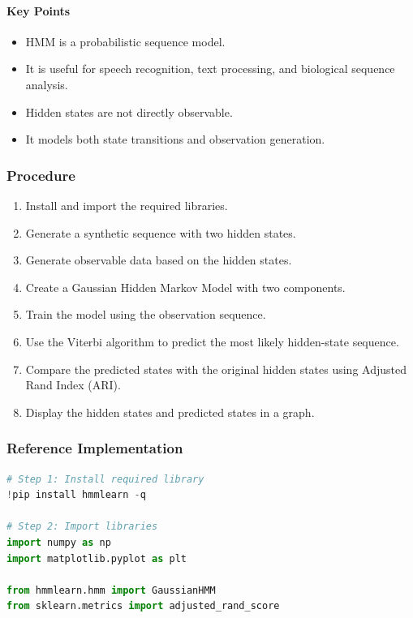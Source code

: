 \documentclass[a4paper,11pt]{article}
\begin{document}
\begin{itemize}
\paragraph{Key Points}
\begin{itemize}
    \item HMM is a probabilistic sequence model.
    \item It is useful for speech recognition, text processing, and biological sequence analysis.
    \item Hidden states are not directly observable.
    \item It models both state transitions and observation generation.
\end{itemize}

\subsubsection{Procedure}
\begin{enumerate}
    \item Install and import the required libraries.
    \item Generate a synthetic sequence with two hidden states.
    \item Generate observable data based on the hidden states.
    \item Create a Gaussian Hidden Markov Model with two components.
    \item Train the model using the observation sequence.
    \item Use the Viterbi algorithm to predict the most likely hidden-state sequence.
    \item Compare the predicted states with the original hidden states using Adjusted Rand Index (ARI).
    \item Display the hidden states and predicted states in a graph.
\end{enumerate}

\subsubsection{Reference Implementation}
\begin{lstlisting}[language=Python, caption={HMM Implementation}]
# Step 1: Install required library
!pip install hmmlearn -q

# Step 2: Import libraries
import numpy as np
import matplotlib.pyplot as plt

from hmmlearn.hmm import GaussianHMM
from sklearn.metrics import adjusted_rand_score


\end{lstlisting}
\end{itemize}
\end{document}
